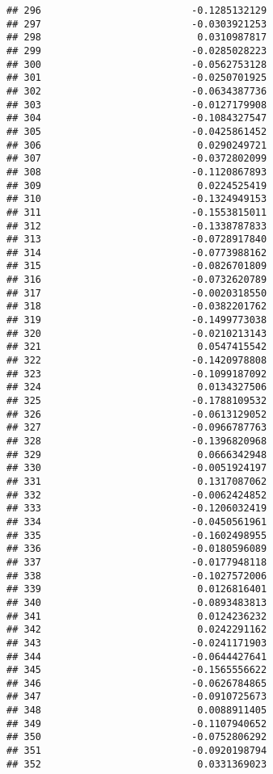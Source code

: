 \documentclass[
]{article}
\begin{document}
\begin{verbatim}
## 296                          -0.1285132129
## 297                          -0.0303921253
## 298                           0.0310987817
## 299                          -0.0285028223
## 300                          -0.0562753128
## 301                          -0.0250701925
## 302                          -0.0634387736
## 303                          -0.0127179908
## 304                          -0.1084327547
## 305                          -0.0425861452
## 306                           0.0290249721
## 307                          -0.0372802099
## 308                          -0.1120867893
## 309                           0.0224525419
## 310                          -0.1324949153
## 311                          -0.1553815011
## 312                          -0.1338787833
## 313                          -0.0728917840
## 314                          -0.0773988162
## 315                          -0.0826701809
## 316                          -0.0732620789
## 317                          -0.0020318550
## 318                          -0.0382201762
## 319                          -0.1499773038
## 320                          -0.0210213143
## 321                           0.0547415542
## 322                          -0.1420978808
## 323                          -0.1099187092
## 324                           0.0134327506
## 325                          -0.1788109532
## 326                          -0.0613129052
## 327                          -0.0966787763
## 328                          -0.1396820968
## 329                           0.0666342948
## 330                          -0.0051924197
## 331                           0.1317087062
## 332                          -0.0062424852
## 333                          -0.1206032419
## 334                          -0.0450561961
## 335                          -0.1602498955
## 336                          -0.0180596089
## 337                          -0.0177948118
## 338                          -0.1027572006
## 339                           0.0126816401
## 340                          -0.0893483813
## 341                           0.0124236232
## 342                           0.0242291162
## 343                          -0.0241171903
## 344                          -0.0644427641
## 345                          -0.1565556622
## 346                          -0.0626784865
## 347                          -0.0910725673
## 348                           0.0088911405
## 349                          -0.1107940652
## 350                          -0.0752806292
## 351                          -0.0920198794
## 352                           0.0331369023

\end{verbatim}
\end{document}
